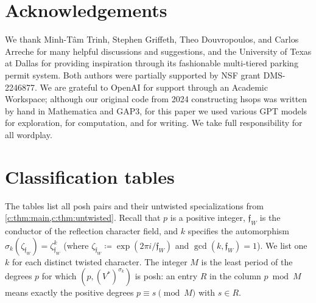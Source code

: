 \documentclass[10pt,a4paper]{amsart}
\newcommand{\defeq}{\coloneqq}
\theoremstyle{definition}
\begin{document}
\section*{Acknowledgements}
We thank Minh-T\^am Trinh, Stephen Griffeth, Theo Douvropoulos, and Carlos Arreche for many
helpful discussions and suggestions, and the University of Texas at Dallas for providing inspiration through its fashionable multi-tiered parking permit system. Both authors were partially supported by
NSF grant DMS-2246877. We are grateful to OpenAI for support through an Academic Workspace; although our original code from 2024 constructing hsops was written by hand in Mathematica and GAP3, for this paper we used various GPT models for exploration, for computation, and for writing.  We take full responsibility for all wordplay.%

\appendix

\section{Classification tables}\label{sec:tables}

The tables list all posh pairs and their untwisted specializations
from \cref{c:thm:main,c:thm:untwisted}. %
Recall that $p$ is a positive integer, $\mathfrak f_W$ is the conductor of the reflection character
field, and $k$ specifies the automorphism
$\sigma_k(\zeta_{\mathfrak f_W})=\zeta_{\mathfrak f_W}^k$ (where
$\zeta_{\mathfrak f_W}\defeq\exp(2\pi i/\mathfrak f_W)$ and
$\gcd(k,\mathfrak f_W)=1$). We list one $k$ for each distinct twisted
character. The integer $M$ is the least period of the degrees $p$
for which $(p,(V^*)^{\sigma_k})$ is posh: an entry $R$
in the column $p\bmod M$ means exactly the positive degrees
$p\equiv s\pmod M$ with $s\in R$. %
\end{document}
